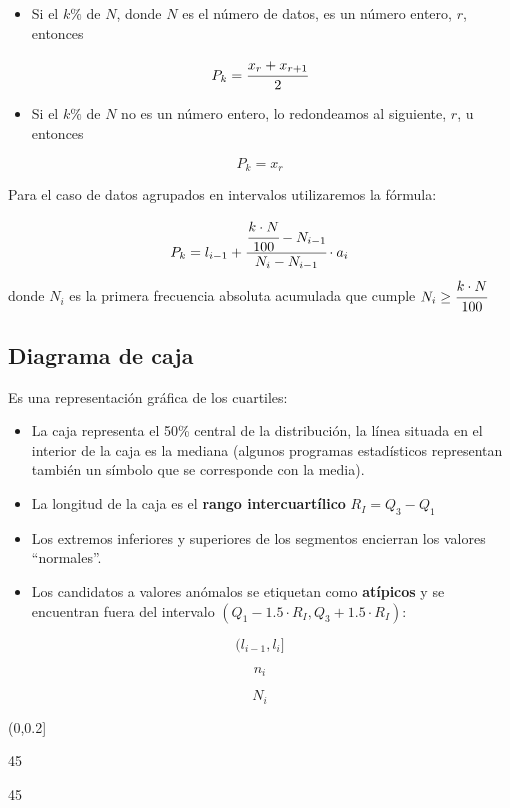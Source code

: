 \documentclass[]{book}
\providecommand{\tightlist}{%
  \setlength{\itemsep}{0pt}\setlength{\parskip}{0pt}}
\theoremstyle{definition}
\theoremstyle{definition}
\theoremstyle{definition}
\theoremstyle{remark}
\begin{document}
\begin{itemize}
\tightlist
\item
  Si el \(k\%\) de \(N\), donde \(N\) es el número de datos, es un
  número entero, \(r\), entonces
\end{itemize}

\[P_k = \cfrac{x_r+x_{r+1}}{2}\]

\begin{itemize}
\tightlist
\item
  Si el \(k\%\) de \(N\) no es un número entero, lo redondeamos al
  siguiente, \(r\), u entonces
\end{itemize}

\[P_k = x_r\]

Para el caso de datos agrupados en intervalos utilizaremos la fórmula:

\[P_k = l_{i-1} + \cfrac{\cfrac{k \cdot N}{100} - N_{i-1}}{N_i -N_{i-1}} \cdot a_i\]
donde \(N_i\) es la primera frecuencia absoluta acumulada que cumple
\(N_i \geq \cfrac{k \cdot N}{100}\)

\subsection{Diagrama de caja}\label{diagrama-de-caja}

Es una representación gráfica de los cuartiles:

\begin{itemize}
\item
  La caja representa el 50\% central de la distribución, la línea
  situada en el interior de la caja es la mediana (algunos programas
  estadísticos representan también un símbolo que se corresponde con la
  media).
\item
  La longitud de la caja es el \textbf{rango intercuartílico}
  \(R_I = Q_3 - Q_1\)
\item
  Los extremos inferiores y superiores de los segmentos encierran los
  valores ``normales''.
\item
  Los candidatos a valores anómalos se etiquetan como \textbf{atípicos}
  y se encuentran fuera del intervalo
  \((Q_1 - 1.5 \cdot R_I,Q_3 + 1.5 \cdot R_I)\):
\end{itemize}

\[ ( l_{i-1}, l_i  ] \]

\[n_i\]

\[N_i\]

(0,0.2{]}

45

45
\end{document}
